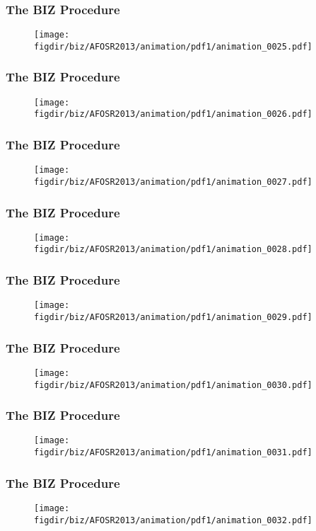 \documentclass[13pt]{beamer}
\newcommand{\figdir}{../../fig}
\begin{document}
{\begin{frame}\frametitle{The BIZ Procedure}\begin{figure}\texttt{[image: \\figdir/biz/AFOSR2013/animation/pdf1/animation\_0025.pdf]}\end{figure}\end{frame}
\begin{frame}\frametitle{The BIZ Procedure}\begin{figure}\texttt{[image: \\figdir/biz/AFOSR2013/animation/pdf1/animation\_0026.pdf]}\end{figure}\end{frame}
\begin{frame}\frametitle{The BIZ Procedure}\begin{figure}\texttt{[image: \\figdir/biz/AFOSR2013/animation/pdf1/animation\_0027.pdf]}\end{figure}\end{frame}
\begin{frame}\frametitle{The BIZ Procedure}\begin{figure}\texttt{[image: \\figdir/biz/AFOSR2013/animation/pdf1/animation\_0028.pdf]}\end{figure}\end{frame}
\begin{frame}\frametitle{The BIZ Procedure}\begin{figure}\texttt{[image: \\figdir/biz/AFOSR2013/animation/pdf1/animation\_0029.pdf]}\end{figure}\end{frame}
\begin{frame}\frametitle{The BIZ Procedure}\begin{figure}\texttt{[image: \\figdir/biz/AFOSR2013/animation/pdf1/animation\_0030.pdf]}\end{figure}\end{frame}
\begin{frame}\frametitle{The BIZ Procedure}\begin{figure}\texttt{[image: \\figdir/biz/AFOSR2013/animation/pdf1/animation\_0031.pdf]}\end{figure}\end{frame}
\begin{frame}\frametitle{The BIZ Procedure}\begin{figure}\texttt{[image: \\figdir/biz/AFOSR2013/animation/pdf1/animation\_0032.pdf]}\end{figure}\end{frame}
}
\end{document}
